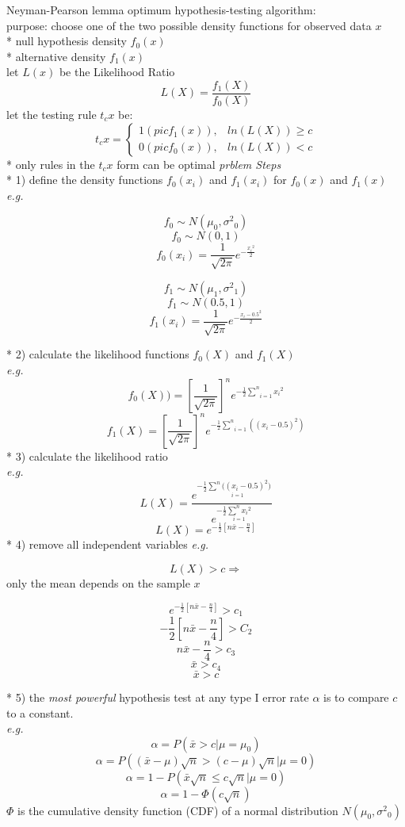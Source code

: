 \documentclass[10pt,landscape]{article}
\begin{document}
\begin{multicols}{3}
Neyman-Pearson lemma optimum hypothesis-testing algorithm: \\
purpose: choose one of the two possible density functions for observed data $x$ \\
* null hypothesis density $f_0(x)$ \\
* alternative density $f_1(x)$ \\
let $L(x)$ be the Likelihood Ratio
$$ L(X) = \frac{f_1(X)}{f_0(X)} $$
let the testing rule $t_c{x}$ be:
$$
t_c{x} = \begin{cases} 1(pic f_1(x)), & ln(L(X)) \geq c \\ 0(pic f_0(x)), & ln(L(X)) < c \end{cases}
$$
* only rules in the $t_c{x}$ form can be optimal
\emph{prblem Steps} \\
* 1) define the density functions $f_0(x_i)$ and $f_1(x_i)$ for $f_0(x)$ and $f_1(x)$ \\
\emph{e.g.}
\begin{multicols}{2}
$$ f_0 \sim N(\mu_0,{\sigma^2}_0) $$
$$ f_0 \sim N(0,1) $$
$$ f_0(x_i) = \frac{1}{\sqrt{2 \pi}} e^{-\frac{{x_i}^2}{2}} $$

\pagebreak 
$$ f_1 \sim N(\mu_1,{\sigma^2}_1) $$
$$ f_1 \sim N(0.5,1) $$
$$ f_1(x_i) = \frac{1}{\sqrt{2 \pi}} e^{-\frac{{x_i - 0.5}^2}{2}} $$
\end{multicols}
* 2) calculate the likelihood functions $f_0(X)$ and $f_1(X)$ \\
\emph{e.g.}
$$ f_0(X)) = \left[\frac{1}{\sqrt{2 \pi}}\right]^n e^{-\frac{1}{2} \underset{i=1}{\overset{n}{\sum}} {x_i}^2} $$
$$ f_1(X) = \left[\frac{1}{\sqrt{2 \pi}}\right]^n e^{-\frac{1}{2} \underset{i=1}{\overset{n}{\sum}} ((x_i - 0.5)^2)} $$
* 3) calculate the likelihood ratio \\
\emph{e.g.}
$$ L(X) = \frac{e^{-\frac{1}{2} \underset{i=1}{\overset{n}{\sum} ((x_i - 0.5)^2})}}{e^{-\frac{1}{2} \underset{i=1}{\overset{n}{\sum} {x_i}^2}}} $$
$$ L(X) = e^{-\frac{1}{2} \left[n \bar{x} - \frac{n}{4}\right]} $$
* 4) remove all independent variables
\emph{e.g.} \\
\begin{multicols}{2}
$$ L(X) > c \Rightarrow $$
only the mean depends on the sample $x$

\pagebreak 
$$ e^{-\frac{1}{2} \left[n \bar{x} - \frac{n}{4}\right]} > c_1 $$
$$ -\frac{1}{2} \left[n \bar{x} - \frac{n}{4}\right] > C_2 $$
$$ n \bar{x} - \frac{n}{4} > c_3 $$
$$ \bar{x} > c_4 $$
$$ \bar{x} > c $$
\end{multicols}
* 5) the \emph{most powerful} hypothesis test at any type I error rate $\alpha$ is to compare $c$ to a constant. \\
\emph{e.g.} \\
$$ \alpha = P(\bar{x} > c | \mu = \mu_0) $$
$$ \alpha = P((\bar{x} - \mu)\sqrt{n} > (c - \mu)\sqrt{n} | \mu = 0) $$
$$ \alpha = 1 - P(\bar{x}\sqrt{n} \leq c\sqrt{n} | \mu = 0) $$
$$ \alpha = 1 - \Phi(c\sqrt{n}) $$
$\Phi$ is the cumulative density function (CDF) of a normal distribution $N(\mu_0,{\sigma^2}_0)$ \\


\end{multicols}
\end{document}
